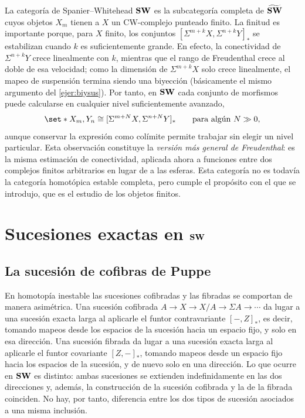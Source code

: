 La categoría de Spanier--Whitehead $\mathbf{SW}$ es la subcategoría completa de $\widetilde{\mathbf{SW}}$ cuyos objetos $X_m$ tienen a $X$ un CW-complejo punteado finito. La finitud es importante porque, para $X$ finito, los conjuntos $[\Sigma^{m+k}X,\Sigma^{n+k}Y]_*$ se estabilizan cuando $k$ es suficientemente grande. En efecto, la conectividad de $\Sigma^{n+k}Y$ crece linealmente con $k$, mientras que el rango de Freudenthal crece al doble de esa velocidad; como la dimensión de $\Sigma^{m+k}X$ solo crece linealmente, el mapeo de suspensión termina siendo una biyección (básicamente el mismo argumento del \cref{ejer:biysus}). Por tanto, en $\mathbf{SW}$ cada conjunto de morfismos puede calcularse en cualquier nivel suficientemente avanzado,
\[
\set*{X_m,Y_n}\cong[\Sigma^{m+N}X,\Sigma^{n+N}Y]_*\qquad\text{para algún }N\gg0,
\]
aunque conservar la expresión como colímite permite trabajar sin elegir un nivel particular. Esta observación constituye la \emph{versión más general de Freudenthal}: es la misma estimación de conectividad, aplicada ahora a funciones entre dos complejos finitos arbitrarios en lugar de a las esferas. Esta categoría no es todavía la categoría homotópica estable completa, pero cumple el propósito con el que se introdujo, que es el estudio de los objetos finitos.

\section{Sucesiones exactas en \texorpdfstring{$\mathbf{SW}$}{SW}}

\subsection{La sucesión de cofibras de Puppe}
En homotopía inestable las sucesiones cofibradas y las fibradas se comportan de manera asimétrica. Una sucesión cofibrada $A\to X\to X/A\to\Sigma A\to\cdots$ da lugar a una sucesión exacta larga al aplicarle el funtor contravariante $[-,Z]_*$, es decir, tomando mapeos desde los espacios de la sucesión hacia un espacio fijo, y solo en esa dirección. Una sucesión fibrada da lugar a una sucesión exacta larga al aplicarle el funtor covariante $[Z,-]_*$, tomando mapeos desde un espacio fijo hacia los espacios de la sucesión, y de nuevo solo en una dirección. Lo que ocurre en $\mathbf{SW}$ es distinto: ambas sucesiones se extienden indefinidamente en las dos direcciones y, además, la construcción de la sucesión cofibrada y la de la fibrada coinciden. No hay, por tanto, diferencia entre los dos tipos de sucesión asociados a una misma inclusión.


